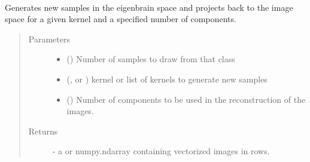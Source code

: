 \documentclass[letterpaper,10pt,english]{sphinxmanual}
\begin{document}
\begin{fulllineitems}
\label{\detokenize{api:brainSimulator.BrainSimulator}}~

\begin{fulllineitems}
\label{\detokenize{api:brainSimulator.BrainSimulator.createNewBrains}}
Generates new samples in the eigenbrain space and projects back to 
the image space for a given kernel and a specified number of 
components.
\begin{quote}\begin{description}
\item[{Parameters}] \leavevmode\begin{itemize}
\item {} 
 () \textendash{} Number of samples to draw from that class

\item {} 
 (,  or         ) \textendash{} kernel or list of kernels to generate new samples

\item {} 
 () \textendash{} Number of components to be used in the         reconstruction of the images.

\end{itemize}

\item[{Returns}] \leavevmode
{} - a  or numpy.ndarray containing          vectorized images in rows.

\end{description}\end{quote}

\end{fulllineitems}



\end{fulllineitems}
\end{document}
